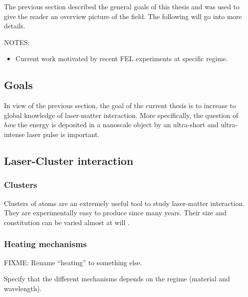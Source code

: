 
The previous section described the general goals of this thesis and was used to
give the reader an overview picture of the field. The following will go
into more details.

NOTES:
\begin{itemize}
\item Current work motivated by recent FEL experiments at specific regime.
\end{itemize}


\subsection{Goals}
In view of the previous section, the goal of the current thesis is to increase
to global knowledge of laser-matter interaction. More specifically, the
question of \textit{how} the energy is deposited in a nanoscale object by an
ultra-short and ultra-intense laser pulse is important.

\cite{Young2010,Chapman2011}

\subsection{Laser-Cluster interaction}


\subsubsection{Clusters}
\label{section:intro:clusters:clusters}

Clusters of atoms are an extremely useful tool to study laser-matter
interaction. They are experimentally easy to produce since many
years\cite{Haberland1994}. Their size and constitution can be varied almost at
will \cite{Martin1996}.

\cite{Fennel2010}

\subsubsection{Heating mechanisms}
\label{section:intro:clusters:heating}
FIXME: Rename ``heating'' to something else.

Specify that the different mechanisms depends on the regime (material and
wavelength).

